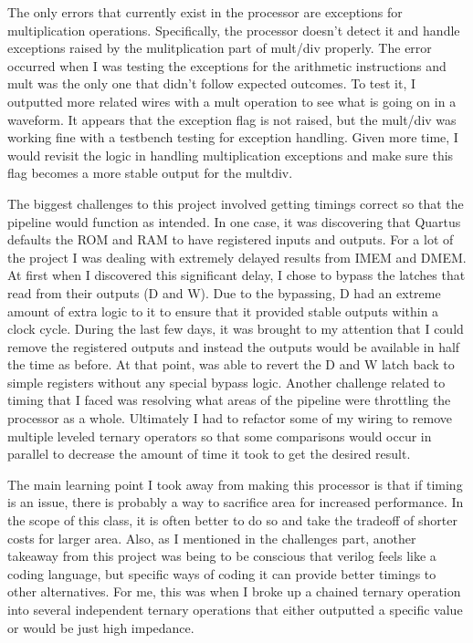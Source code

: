 \documentclass[letterpaper]{article} %
\begin{document}
The only errors that currently exist in the processor are exceptions for multiplication operations. Specifically,  the processor doesn't detect it and handle exceptions raised by the mulitplication part of mult/div properly. The error occurred when I was testing the exceptions for the arithmetic instructions and mult was the only one that didn't follow expected outcomes. To test it, I outputted more related wires with a mult operation to see what is going on in a waveform. It appears that the exception flag is not raised, but the mult/div was working fine with a testbench testing for exception handling. Given more time, I would revisit the logic in handling multiplication exceptions and make sure this flag becomes a more stable output for the multdiv.

The biggest challenges to this project involved getting timings correct so that the pipeline would function as intended. In one case, it was discovering that Quartus defaults the ROM and RAM to have registered inputs and outputs. For a lot of the project I was dealing with extremely delayed results from IMEM and DMEM. At first when I discovered this significant delay, I chose to bypass the latches that read from their outputs (D and W). Due to the bypassing, D had an extreme amount of extra logic to it to ensure that it provided stable outputs within a clock cycle. During the last few days, it was brought to my attention that I could remove the registered outputs and instead the outputs would be available in half the time as before. At that point, was able to revert the D and W latch back to simple registers without any special bypass logic. Another challenge related to timing that I faced was resolving what areas of the pipeline were throttling the processor as a whole. Ultimately I had to refactor some of my wiring to remove multiple leveled ternary operators so that some comparisons would occur in parallel to decrease the amount of time it took to get the desired result.

The main learning point I took away from making this processor is that if timing is an issue, there is probably a way to sacrifice area for increased performance. In the scope of this class, it is often better to do so and take the tradeoff of shorter costs for larger area. Also, as I mentioned in the challenges part, another takeaway from this project was being to be conscious that verilog feels like a coding language, but specific ways of coding it can provide better timings to other alternatives. For me, this was when I broke up a chained ternary operation into several independent ternary operations that either outputted a specific value or would be just high impedance.
\end{document}

